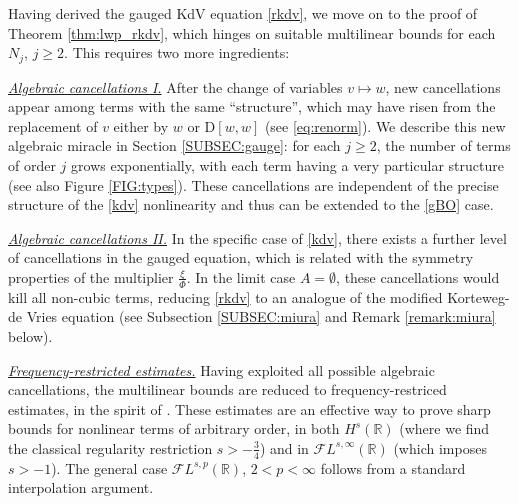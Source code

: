 \documentclass[a4paper,
11pt,  reqno]{amsart}
\newcommand{\5}{\textup{V}}
\newcommand{\noi}{\noindent}
\newcommand{\FL}{\mathcal{F} L}
\theoremstyle{remark}
\newcommand{\R}{\mathbb{R}}
\numberwithin{equation}{section}
\numberwithin{theorem}{section}
\newcommand{\D}{\mathrm{D}}
\begin{document}
	\medskip




	Having derived the gauged KdV equation \eqref{rkdv}, we move on to the proof of Theorem \ref{thm:lwp_rkdv}, which hinges on suitable multilinear bounds for each $N_j$, $j\ge 2$. This requires two more ingredients:

    \smallskip
    \noi\textit{\underline{Algebraic cancellations I.}} After the change of variables $v\mapsto w$, new cancellations appear among terms with the same ``structure'', which may have risen from the replacement of $v$ either by $w$ or $\D[w,w]$ (see \eqref{eq:renorm}). We describe this new algebraic miracle in Section \ref{SUBSEC:gauge}:
for each $j\ge 2$, the number of terms of order $j$ grows exponentially, with each term having a very particular structure (see also Figure \ref{FIG:types}). These cancellations are independent of the precise structure of the \eqref{kdv} nonlinearity and thus can be extended to the \eqref{gBO} case.


    \smallskip
    
    \noi\textit{\underline{Algebraic cancellations II.}} In the specific case of \eqref{kdv}, there exists a further level of cancellations in the gauged equation, which is related with the symmetry properties of the multiplier $\frac\xi\Phi$. In the limit case $A=\emptyset$, these cancellations would kill all non-cubic terms, reducing \eqref{rkdv} to an analogue of the modified Korteweg-de Vries equation (see Subsection \ref{SUBSEC:miura} and Remark \ref{remark:miura} below).


    \smallskip
    
    \noi\textit{\underline{Frequency-restricted estimates.}} Having exploited all possible algebraic cancellations, the multilinear bounds are reduced to frequency-restriced estimates, in the spirit of \cite{CC24, CLS, COS}. These estimates are an effective way to prove sharp bounds for nonlinear terms of arbitrary order, in both $H^s(\R)$ (where we find the classical regularity restriction $s>-\frac34$) and in $\FL^{s,\infty}(\R)$ (which imposes $s>-1$). The general case $\FL^{s,p}(\R)$, $2<p<\infty$ follows from a standard interpolation argument.
\end{document}
